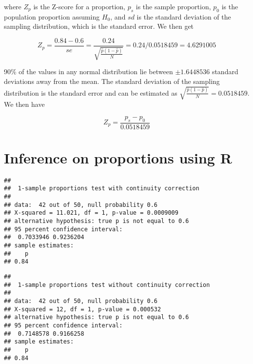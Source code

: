 where $Z_p$ is the Z-score for a proportion, $p_s$ is the sample proportion, $p_0$ is the population proportion assuming $H_0$, and $sd$ is the standard deviation of the sampling distribution, which is the standard error. We then get

\begin{equation}
Z_p = \frac{0.84 - 0.6}{se} = \frac{0.24}{\sqrt{\frac{\hat{p}(1-\hat{p})}{N}}} = 0.24 / 0.0518459 = 4.6291005
\end{equation}


90\% of the values in any normal distribution lie between $\pm 1.6448536$ standard deviations away from the mean. The standard deviation of the sampling distribution is the standard error and can be estimated as $\sqrt{\frac{\hat{p}(1-\hat{p})}{N}} = 0.0518459$. We  then have

\begin{equation}
Z_p = \frac{p_s - p_0}{0.0518459} 
\end{equation}

\section{Inference on proportions using R}


\begin{knitrout}
\color{fgcolor}\begin{kframe}
\begin{alltt}
\hlstd{(}\hlstd{,} \hlstd{,}  \hlstd{=} \hlstd{,}  
\end{alltt}
\begin{verbatim}
## 
## 	1-sample proportions test with continuity correction
## 
## data:  42 out of 50, null probability 0.6
## X-squared = 11.021, df = 1, p-value = 0.0009009
## alternative hypothesis: true p is not equal to 0.6
## 95 percent confidence interval:
##  0.7033946 0.9236204
## sample estimates:
##    p 
## 0.84
\end{verbatim}
\end{kframe}
\end{knitrout}

\begin{knitrout}
\color{fgcolor}\begin{kframe}
\begin{alltt}
\hlstd{(}\hlstd{,} \hlstd{,}  \hlstd{=} \hlstd{,}  
\end{alltt}
\begin{verbatim}
## 
## 	1-sample proportions test without continuity correction
## 
## data:  42 out of 50, null probability 0.6
## X-squared = 12, df = 1, p-value = 0.000532
## alternative hypothesis: true p is not equal to 0.6
## 95 percent confidence interval:
##  0.7148578 0.9166258
## sample estimates:
##    p 
## 0.84
\end{verbatim}
\end{kframe}
\end{knitrout}


